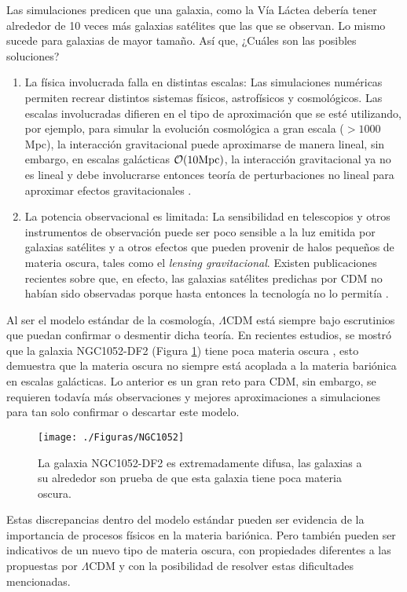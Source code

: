\documentclass[a4paper,openright,12pt]{book}
\begin{document}
Las simulaciones predicen que una galaxia, como la Vía Láctea debería tener alrededor de 10 veces más galaxias satélites que las que se observan. Lo mismo sucede para galaxias de mayor tamaño. Así que, ¿Cuáles son las posibles soluciones?
\begin{enumerate}
\item La física involucrada falla en distintas escalas: Las simulaciones numéricas permiten recrear distintos sistemas físicos, astrofísicos y cosmológicos. Las escalas involucradas difieren en el tipo de aproximación que se esté utilizando, por ejemplo, para simular la evolución cosmológica a gran escala ($>1000$Mpc), la interacción gravitacional puede aproximarse de manera lineal, sin embargo, en escalas galácticas $\mathcal{O}(10\textup{Mpc})$, la interacción gravitacional ya no es lineal y  debe involucrarse entonces teoría de perturbaciones no lineal para aproximar efectos gravitacionales \cite{1.2.5}.

\item La potencia observacional es limitada: La sensibilidad en telescopios y otros instrumentos de observación puede ser poco sensible a la luz emitida por galaxias satélites y a otros efectos que pueden provenir de halos pequeños de materia oscura, tales como el \textit{lensing gravitacional}. Existen publicaciones recientes sobre que, en efecto, las galaxias satélites predichas por CDM no habían sido observadas porque hasta entonces la tecnología no lo permitía \cite{1.2.6}.
\end{enumerate}

Al ser el modelo estándar de la cosmología, $\Lambda$CDM está siempre bajo escrutinios que puedan confirmar o desmentir dicha teoría. En recientes estudios, se mostró que la galaxia NGC1052-DF2 (Figura \ref{fig 1.10}) tiene poca materia oscura \cite{1.2.6.1}, esto demuestra que la materia oscura no siempre está acoplada a la materia bariónica en escalas galácticas. Lo anterior es un gran reto para CDM, sin embargo, se requieren todavía más observaciones y mejores aproximaciones a simulaciones para tan solo confirmar o descartar este modelo.

\begin{figure}
\centering
\texttt{[image: ./Figuras/NGC1052]}
\caption{\footnotesize{La galaxia NGC1052-DF2 es extremadamente difusa, las galaxias a su alrededor son prueba de que esta galaxia tiene poca materia oscura.}}\label{fig 1.10}
\end{figure}
 
Estas discrepancias dentro del modelo estándar pueden ser evidencia de la importancia de procesos físicos en la materia bariónica. Pero también pueden ser indicativos de un nuevo tipo de materia oscura, con propiedades diferentes a las propuestas por $\Lambda$CDM y con la posibilidad de resolver estas dificultades mencionadas.
\end{document}
